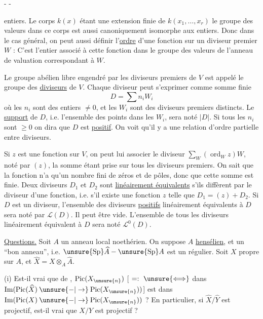 -  -

entiers. Le corps $k(x)$ étant une extension finie de $k(x_1,\ldots,x_r)$ le groupe des valeurs dans ce corps est aussi canoniquement isomorphe aux entiers. Donc dans le cas général, on peut aussi définir l'\uline{ordre} d'une fonction sur un diviseur premier $W$ : C'est l'entier associé à cette fonction dans le groupe des valeurs de l'anneau de valuation correspondant à $W$.

Le groupe abélien libre engendré par les diviseurs premiers de $V$ est appelé le groupe des \uline{diviseurs} de $V$. Chaque diviseur peut s'exprimer comme somme finie
\[
D=\sum n_iW_i
\]
où les $n_i$ sont des entiers $\ne 0$, et les $W_i$ sont des diviseurs premiers distincts. Le \uline{support} de $D$, i.e. l'ensemble des points dans les $W_i$, sera noté $|D|$. Si tous les $n_i$ sont $\geq 0$ on dira que $D$ est \uline{positif}. On voit qu'il y a une relation d'ordre partielle entre diviseurs.

Si $z$ est une fonction sur $V$, on peut lui associer le diviseur $\sum_W(\operatorname{ord}_Wz)W$, noté par $(z)$, la somme étant prise sur tous les diviseurs premiers. On sait que la fonction n'a qu'un nombre fini de zéros et de pôles, donc que cette somme est finie. Deux diviseurs $D_1$ et $D_2$ sont \uline{linéairement équivalents} s'ils diffèrent par le diviseur d'une fonction, i.e. s'il existe une fonction $z$ telle que $D_1=(z)+D_2$. Si $D$ est un diviseur, l'ensemble des diviseurs \uline{positifs} linéairement équivalents à $D$ sera noté par $\mathcal{L}(D)$. Il peut être vide. L'ensemble de tous les diviseurs linéairement équivalent à $D$ sera noté $\mathcal{L}^0(D)$.

\uline{Questions.}  Soit $A$ un anneau local  noethérien. On suppose $A$ \uline{hensélien}, et un ``bon anneau'', i.e. $\unsure{\operatorname{Sp}}\widehat A-\unsure{\operatorname{Sp}}A$ est  un  régulier. Soit $X$ propre sur $A$, et $\widehat X=X\otimes_A\widehat A$.

(i) Est-il vrai que  de \unsure{--}, $\operatorname{Pic}(X_{\unsure{n}})$  [ $=:\ \unsure{\Longleftrightarrow}$  dans $\operatorname{Im}(\operatorname{Pic}(\widehat X)\mathbin{\unsure{-|\to}}\operatorname{Pic}(X_{\unsure{n}}))$] est dans $\operatorname{Im}(\operatorname{Pic}(X)\mathbin{\unsure{-|\to}}\operatorname{Pic}(X_{\unsure{n}}))$ ? En particulier, si $\widehat X/\widehat Y$ est projectif, est-il vrai que $X/Y$ est projectif ?

